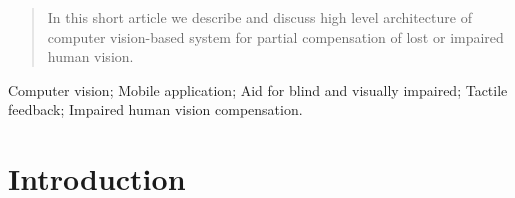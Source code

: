 \documentclass[10pt,conference,compsocconf]{IEEEtran}
\begin{document}




\maketitle


\begin{abstract}
In this short article we describe and discuss high level architecture of computer vision-based system for partial compensation of lost or impaired human vision.
\end{abstract}


\begin{IEEEkeywords}
Computer vision; Mobile application; Aid for blind and visually impaired; Tactile feedback; Impaired human vision compensation.%
\end{IEEEkeywords}



%
\IEEEpeerreviewmaketitle


\section{Introduction}
\label{sec:introduction}
\end{document}
